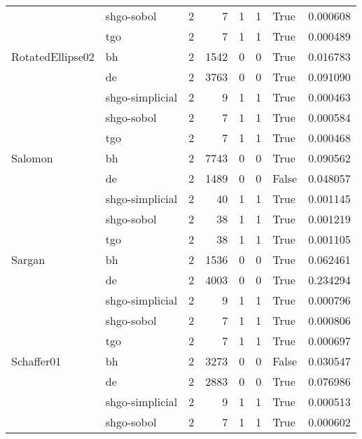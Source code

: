 \begin{longtable}{llrrrrlr}
         & shgo-sobol &     2 &        7 &      1 &       1 &    True &    0.000608 \\
         & tgo &     2 &        7 &      1 &       1 &    True &    0.000489 \\
RotatedEllipse02 & bh &     2 &     1542 &      0 &       0 &    True &    0.016783 \\
         & de &     2 &     3763 &      0 &       0 &    True &    0.091090 \\
         & shgo-simplicial &     2 &        9 &      1 &       1 &    True &    0.000463 \\
         & shgo-sobol &     2 &        7 &      1 &       1 &    True &    0.000584 \\
         & tgo &     2 &        7 &      1 &       1 &    True &    0.000468 \\
Salomon & bh &     2 &     7743 &      0 &       0 &    True &    0.090562 \\
         & de &     2 &     1489 &      0 &       0 &   False &    0.048057 \\
         & shgo-simplicial &     2 &       40 &      1 &       1 &    True &    0.001145 \\
         & shgo-sobol &     2 &       38 &      1 &       1 &    True &    0.001219 \\
         & tgo &     2 &       38 &      1 &       1 &    True &    0.001105 \\
Sargan & bh &     2 &     1536 &      0 &       0 &    True &    0.062461 \\
         & de &     2 &     4003 &      0 &       0 &    True &    0.234294 \\
         & shgo-simplicial &     2 &        9 &      1 &       1 &    True &    0.000796 \\
         & shgo-sobol &     2 &        7 &      1 &       1 &    True &    0.000806 \\
         & tgo &     2 &        7 &      1 &       1 &    True &    0.000697 \\
Schaffer01 & bh &     2 &     3273 &      0 &       0 &   False &    0.030547 \\
         & de &     2 &     2883 &      0 &       0 &    True &    0.076986 \\
         & shgo-simplicial &     2 &        9 &      1 &       1 &    True &    0.000513 \\
         & shgo-sobol &     2 &        7 &      1 &       1 &    True &    0.000602 \\

\end{longtable}
